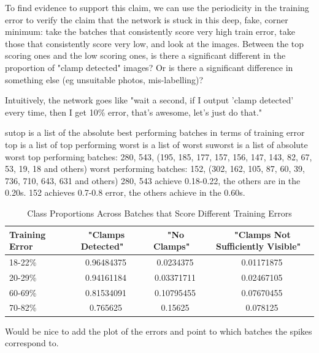 \documentclass[a4paper,11pt]{article}
\begin{document}
To find evidence to support this claim, we can use the periodicity in the training error to verify the claim that the network is stuck in this deep, fake, corner minimum: take the batches that consistently score very high train error, take those that consistently score very low, and look at the images. Between the top scoring ones and the low scoring ones, is there a significant different in the proportion of "clamp detected" images? Or is there a significant difference in something else (eg unsuitable photos, mis-labelling)?

Intuitively, the network goes like "wait a second, if I output 'clamp detected' every time, then I get 10\% error, that's awesome, let's just do that."

sutop is a list of the absolute best performing batches in terms of training error
top is a list of top performing
worst is a list of worst
suworst is a list of absolute worst
top performing batches: 280, 543, (195, 185, 177, 157, 156, 147, 143, 82, 67, 53, 19, 18 and others)
worst performing batches: 152, (302, 162, 105, 87, 60, 39, 736, 710, 643, 631 and others)
280, 543 achieve 0.18-0.22, the others are in the 0.20s. 152 achieves 0.7-0.8 error, the others achieve in the 0.60s. \\

\begin{table}[h]
   \centering
    \begin{tabular}{|l|c|c|c|}
    \hline
    Training Error   & ~  "Clamps Detected"  & ~ "No Clamps"        & ~ "Clamps Not Sufficiently Visible" \\ \hline
    18-22\%          & ~  0.96484375        & ~  0.0234375         & ~  0.01171875 \\
    20-29\%          & ~  0.94161184        & ~  0.03371711        & ~  0.02467105 \\
    60-69\%          & ~  0.81534091        & ~  0.10795455        & ~  0.07670455 \\
    70-82\%          & ~  0.765625          & ~  0.15625           & ~  0.078125   \\
    \hline
    \end{tabular}
    \caption {Class Proportions Across Batches that Score Different Training Errors}
\end{table} 

Would be nice to add the plot of the errors and point to which batches the spikes correspond to. \\
\end{document}
